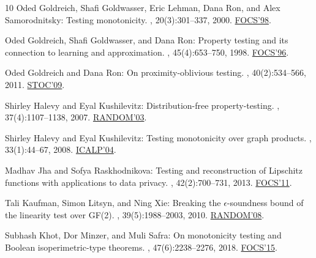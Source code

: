\documentclass[11pt]{article}
\numberwithin{equation}{section}
\theoremstyle{definition}
\theoremstyle{plain}
\begin{document}
\begin{thebibliography}{10}
{\sc Oded Goldreich, Shafi Goldwasser, Eric Lehman, Dana Ron, and Alex
  Samorodnitsky}: Testing monotonicity.
, 20(3):301--337, 2000.
\newblock \prelim \href{http://doi.org/10.1109/SFCS.1998.743493}{FOCS'98}.
\newblock [\epfmtdoi{10.1007/s004930070011}]

{\sc Oded Goldreich, Shafi Goldwasser, and Dana Ron}: Property testing and its
  connection to learning and approximation.
, 45(4):653--750, 1998.
\newblock \prelim \href{https://doi.org/10.1109/SFCS.1996.548493}{FOCS'96}.
\newblock [\epfmtdoi{10.1145/285055.285060}]

{\sc Oded Goldreich and Dana Ron}: On proximity-oblivious testing.
, 40(2):534--566, 2011.
\newblock \prelim \href{https://doi.org/10.1145/1536414.1536436}{STOC'09}.
\newblock [\epfmtdoi{10.1137/100789646}]

{\sc Shirley Halevy and Eyal Kushilevitz}: Distribution-free property-testing.
, 37(4):1107--1138, 2007.
\newblock \prelim
  \href{https://doi.org/10.1007/978-3-540-45198-3\_26}{RANDOM'03}.
\newblock [\epfmtdoi{10.1137/050645804}]

{\sc Shirley Halevy and Eyal Kushilevitz}: Testing monotonicity over graph
  products.
, 33(1):44--67, 2008.
\newblock \prelim
  \href{https://doi.org/10.1007/978-3-540-27836-8\_61}{ICALP'04}.

{\sc Madhav Jha and Sofya Raskhodnikova}: Testing and reconstruction of
  {Lipschitz} functions with applications to data privacy.
, 42(2):700--731, 2013.
\newblock \prelim \href{https://doi.org/10.1109/FOCS.2011.13}{FOCS'11}.
\newblock [\epfmtdoi{10.1137/110840741}]

{\sc Tali Kaufman, Simon Litsyn, and Ning Xie}: Breaking the
  $\epsilon$-soundness bound of the linearity test over {GF(2)}.
, 39(5):1988--2003, 2010.
\newblock \prelim
  \href{https://doi.org/10.1007/978-3-540-85363-3\_39}{RANDOM'08}.
\newblock [\epfmtdoi{10.1137/080715548}]

{\sc Subhash Khot, Dor Minzer, and Muli Safra}: On monotonicity testing and
  {Boolean} isoperimetric-type theorems.
, 47(6):2238--2276, 2018.
\newblock \prelim \href{https://doi.org/10.1109/FOCS.2015.13}{FOCS'15}.
\newblock [\epfmtdoi{10.1137/16M1065872}]


\end{thebibliography}
\end{document}
